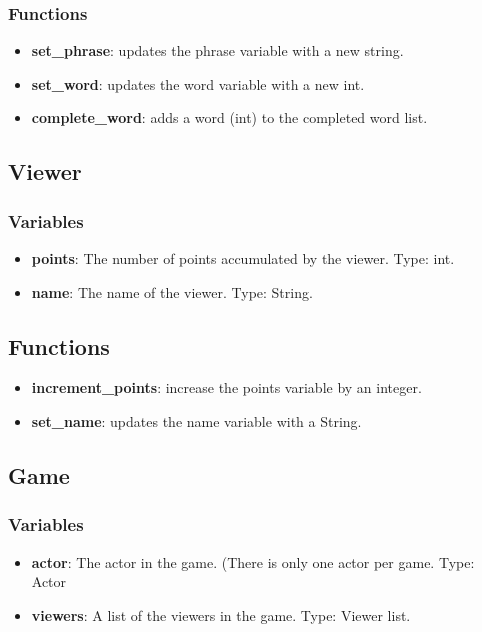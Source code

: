 \documentclass{article}
\begin{document}
\subsubsection{Functions}

\begin{itemize}
	\item \textbf{set\_phrase}: updates the phrase variable with a new string.
	
	\item \textbf{set\_word}: updates the word variable with a  new int.
	
	\item \textbf{complete\_word}: adds a word (int) to the completed word list.

\end{itemize}


\subsection{Viewer}
\subsubsection{Variables}

\begin{itemize}
	\item \textbf{points}: The number of points accumulated by the viewer. Type: int.

	\item \textbf{name}: The name of the viewer. Type: String.

\end{itemize}

\subsection{Functions}

\begin{itemize}
	\item \textbf{increment\_points}: increase the points variable by an integer.
	
	\item \textbf{set\_name}: updates the name variable with a String.
	
\end{itemize}

\subsection{Game}
\subsubsection{Variables}
\begin{itemize}
	\item \textbf{actor}: The actor in the game. (There is only one actor per game. Type: Actor
	
	\item \textbf{viewers}: A list of the viewers in the game. Type: Viewer list.
	
\end{itemize}
\end{document}

